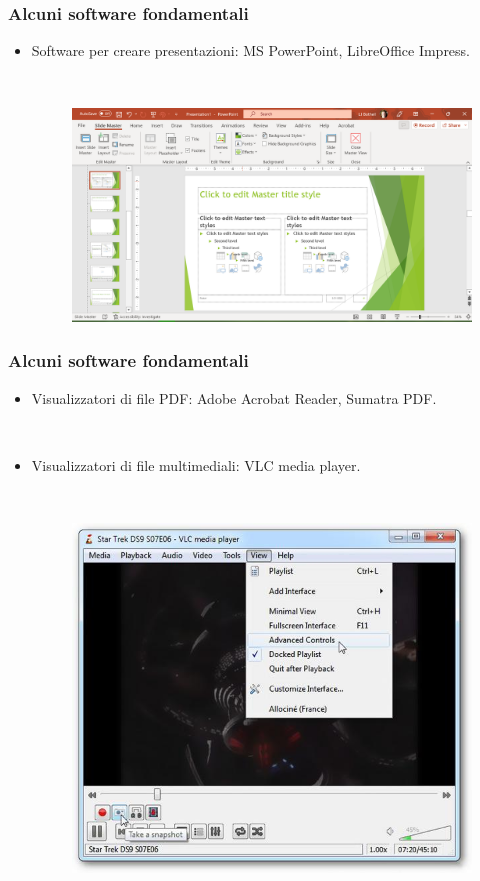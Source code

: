\documentclass[handout]{beamer}
\begin{document}
\begin{frame}
\frametitle{Alcuni software fondamentali}
\begin{itemize}
  \item Software per creare presentazioni: MS PowerPoint, LibreOffice Impress.
  
  ~

  \begin{figure}
    \includegraphics[width=.9\columnwidth]{img/powerpoint.png}
  \end{figure}
\end{itemize}
\end{frame}

\begin{frame}
\frametitle{Alcuni software fondamentali}
\begin{itemize}
  \item Visualizzatori di file PDF: Adobe Acrobat Reader, Sumatra PDF.
  
  ~

  \item Visualizzatori di file multimediali: VLC media player.
  
  ~

  \begin{figure}
    \includegraphics[width=.5\columnwidth]{img/vlc.jpg}
  \end{figure}
\end{itemize}
\end{frame}
\end{document}
